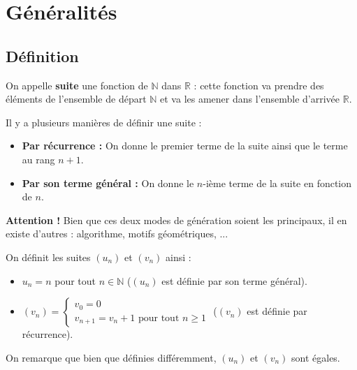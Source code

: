 


	
	
	
	
	\section{Généralités}
	
	\subsection{Définition}
	
	On appelle \textbf{suite} une fonction de $\mathbb{N}$ dans $\mathbb{R}$ : cette fonction va prendre des éléments de l'ensemble de départ $\mathbb{N}$ et va les amener dans l'ensemble d'arrivée $\mathbb{R}$.
	
	\begin{formula}[Définition]
		Il y a plusieurs manières de définir une suite :
		\begin{itemize}
			\item \textbf{Par récurrence :} On donne le premier terme de la suite ainsi que le terme au rang $n+1$.
			\item \textbf{Par son terme général :} On donne le $n$-ième terme de la suite en fonction de $n$.
		\end{itemize}
	\end{formula}
	
	\textbf{Attention !} Bien que ces deux modes de génération soient les principaux, il en existe d'autres : algorithme, motifs géométriques, ...
	
	\begin{tip}[Exemple]
		On définit les suites $(u_n)$ et $(v_n)$ ainsi :
		\begin{itemize}
			\item $u_n = n$ pour tout $n \in \mathbb{N}$ ($(u_n)$ est définie par son terme général).
			\item $(v_n) = \begin{cases} v_0 = 0 \\ v_{n+1} = v_n + 1 \text{ pour tout } n \geq 1 \end{cases}$ ($(v_n)$ est définie par récurrence).
		\end{itemize}
		On remarque que bien que définies différemment, $(u_n)$ et $(v_n)$ sont égales.
	\end{tip}
	
